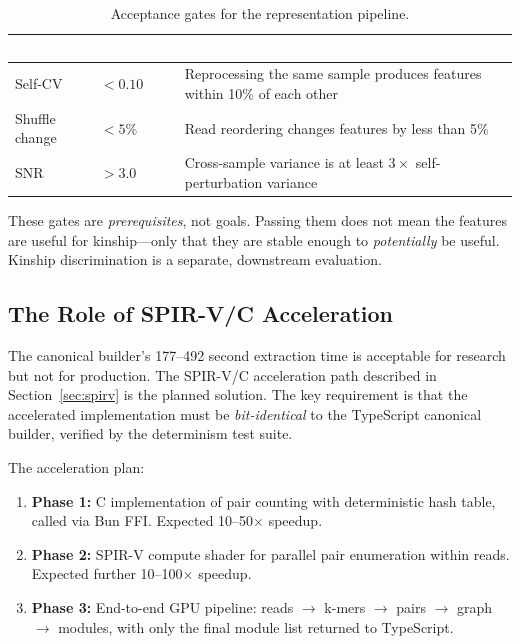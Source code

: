 \documentclass{../yalumba}
\begin{document}
\begin{table}[H]
\centering
\caption{Acceptance gates for the representation pipeline.}
\label{tab:gates}
\begin{tabular}{llp{6cm}}
\toprule
\rowcolor{table-header}
\textcolor{white}{\textbf{Gate}} & \textcolor{white}{\textbf{Threshold}} & \textcolor{white}{\textbf{Meaning}} \\
\midrule
Self-CV        & $< 0.10$  & Reprocessing the same sample produces features within 10\% of each other \\
Shuffle change & $< 5\%$   & Read reordering changes features by less than 5\% \\
SNR            & $> 3.0$   & Cross-sample variance is at least $3\times$ self-perturbation variance \\
\bottomrule
\end{tabular}
\end{table}

These gates are \textit{prerequisites}, not goals. Passing them does not mean
the features are useful for kinship---only that they are stable enough to
\textit{potentially} be useful. Kinship discrimination is a separate, downstream
evaluation.

\subsection{The Role of SPIR-V/C Acceleration}

The canonical builder's 177--492 second extraction time is acceptable for
research but not for production. The SPIR-V/C acceleration path described in
Section~\ref{sec:spirv} is the planned solution. The key requirement is that
the accelerated implementation must be \textit{bit-identical} to the TypeScript
canonical builder, verified by the determinism test suite.

The acceleration plan:
\begin{enumerate}[leftmargin=2em]
  \item \textbf{Phase 1:} C implementation of pair counting with deterministic
    hash table, called via Bun FFI. Expected 10--50$\times$ speedup.
  \item \textbf{Phase 2:} SPIR-V compute shader for parallel pair enumeration
    within reads. Expected further 10--100$\times$ speedup.
  \item \textbf{Phase 3:} End-to-end GPU pipeline: reads $\to$ k-mers $\to$
    pairs $\to$ graph $\to$ modules, with only the final module list returned
    to TypeScript.
\end{enumerate}
\end{document}

